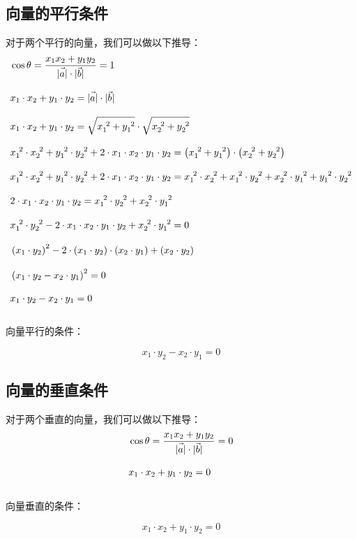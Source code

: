 \documentclass[UTF8]{ctexart}
\let\nvec\vec
\def\vec#1{\nvec{\vphantom b\smash{#1}}}
\begin{document}
\subsection{向量的平行条件}
    对于两个平行的向量，我们可以做以下推导：\\
    \setcounter{equation}{0}
    \begin{align}
        &\cos{\theta}=\frac{x_1x_2+y_1y_2}{|\vec{a}|\cdot|\vec{b}|}=1\\[3mm]
        &x_1\cdot x_2+y_1\cdot y_2=|\vec{a}|\cdot|\vec{b}|\\[3mm]
        &x_1\cdot x_2+y_1\cdot y_2=\sqrt{x_1^{~2}+y_1^{~2}}\cdot\sqrt{x_2^{~2}+y_2^{~2}}\\[3mm]
        &x_1^{~2}\cdot x_2^{~2}+y_1^{~2}\cdot y_2^{~2}+2\cdot x_1\cdot x_2\cdot y_1\cdot y_2=\left(x_1^{~2}+y_1^{~2}\right)\cdot\left(x_2^{~2}+y_2^{~2}\right)\\[3mm]
        &x_1^{~2}\cdot x_2^{~2}+y_1^{~2}\cdot y_2^{~2}+2\cdot x_1\cdot x_2\cdot y_1\cdot y_2=x_1^{~2}\cdot x_2^{~2}+x_1^{~2}\cdot y_2^{~2}+x_2^{~2}\cdot y_1^{~2}+y_1^{~2}\cdot y_2^{~2}\\[3mm]
        &2\cdot x_1\cdot x_2\cdot y_1\cdot y_2=x_1^{~2}\cdot y_2^{~2}+x_2^{~2}\cdot y_1^{~2}\\[3mm]
        &x_1^{~2}\cdot y_2^{~2}-2\cdot x_1\cdot x_2\cdot y_1\cdot y_2+x_2^{~2}\cdot y_1^{~2}=0\\[3mm]
        &\left(x_1\cdot y_2\right)^2-2\cdot\left(x_1\cdot y_2\right)\cdot\left(x_2\cdot y_1\right)+\left(x_2\cdot y_2\right)\\[3mm]
        &\left(x_1\cdot y_2-x_2\cdot y_1\right)^2=0\\[3mm]
        &x_1\cdot y_2-x_2\cdot y_1=0
    \end{align}\\
    向量平行的条件：
    \begin{large}
        \begin{equation*}
            x_1\cdot y_2-x_2\cdot y_1=0
        \end{equation*}
    \end{large}

\subsection{向量的垂直条件}
    对于两个垂直的向量，我们可以做以下推导：\\
    \setcounter{equation}{0}
    \begin{align}
        &\cos{\theta}=\frac{x_1x_2+y_1y_2}{|\vec{a}|\cdot|\vec{b}|}=0\\[3mm]
        &x_1\cdot x_2+y_1\cdot y_2=0
    \end{align}\\
    向量垂直的条件：
    \begin{large}
        \begin{equation*}
            x_1\cdot x_2+y_1\cdot y_2=0
        \end{equation*}
    \end{large}
\end{document}
